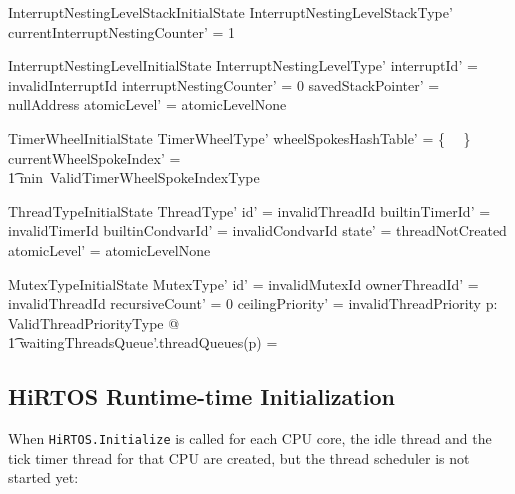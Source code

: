 \documentclass[11pt,letterpaper,twoside,openany]{book}
\begin{document}
\begin{schema}{InterruptNestingLevelStackInitialState}
   InterruptNestingLevelStackType'
\where
   currentInterruptNestingCounter' = 1 \\
\end{schema}

\begin{schema}{InterruptNestingLevelInitialState}
   InterruptNestingLevelType'
\where
   interruptId' = invalidInterruptId
\also
   interruptNestingCounter' = 0
\also
   savedStackPointer' = nullAddress
\also
   atomicLevel' = atomicLevelNone
\end{schema}

\begin{schema}{TimerWheelInitialState}
   TimerWheelType'
\where
   \ran wheelSpokesHashTable' = \{~ \emptyset ~\}
\also
   currentWheelSpokeIndex' = \\
   \t1 min~ValidTimerWheelSpokeIndexType
\end{schema}


\begin{schema}{ThreadTypeInitialState}
   ThreadType'
\where
   id' = invalidThreadId
\also
   builtinTimerId' = invalidTimerId
\also
   builtinCondvarId' = invalidCondvarId
\also
   state' = threadNotCreated
\also
   atomicLevel' = atomicLevelNone
\end{schema}


\begin{schema}{MutexTypeInitialState}
   MutexType'
\where
  id' = invalidMutexId
\also
  ownerThreadId' = invalidThreadId
\also
  recursiveCount' = 0
\also
  ceilingPriority' = invalidThreadPriority
\also
   \forall p: ValidThreadPriorityType @ \\
\t1      waitingThreadsQueue'.threadQueues(p) = \emptyset
\end{schema}

\subsection{HiRTOS Runtime-time Initialization}
When \verb`HiRTOS.Initialize` is called for each CPU core, the idle thread
and the tick timer thread for that CPU are created, but the thread
scheduler is not started yet:
\end{document}
